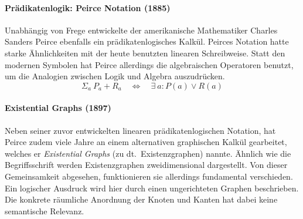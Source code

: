 \paragraph{Prädikatenlogik: Peirce Notation (1885)}
Unabhängig von Frege entwickelte der amerikanische Mathematiker Charles Sanders Peirce ebenfalls ein prädikatenlogisches Kalkül.
Peirces Notation hatte starke Ähnlichkeiten mit der heute benutzten linearen Schreibweise.
Statt den modernen Symbolen hat Peirce allerdings die algebraischen Operatoren benutzt, um die Analogien zwischen Logik und Algebra auszudrücken.
\begin{equation*}
	\Sigma_a\ P_a + R_a
	\quad\Leftrightarrow\quad
	\exists\ a: P(a) \lor R(a)
\end{equation*}

\paragraph{Existential Graphs (1897)}
Neben seiner zuvor entwickelten linearen prädikatenlogischen Notation, hat Peirce zudem viele Jahre an einem alternativen graphischen Kalkül gearbeitet, welches er \textit{Existential Graphs} (zu dt.~Existenzgraphen) nannte.
Ähnlich wie die Begriffsschrift werden Existenzgraphen zweidimensional dargestellt.
Von dieser Gemeinsamkeit abgesehen, funktionieren sie allerdings fundamental verschieden.
Ein logischer Ausdruck wird hier durch einen ungerichteten Graphen beschrieben.
Die konkrete räumliche Anordnung der Knoten und Kanten hat dabei keine semantische Relevanz.

